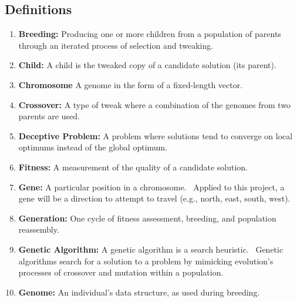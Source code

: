 \documentclass[letterpaper, 12pt]{article}
\begin{document}
  \subsection{Definitions}
  \begin{enumerate}
	 \item\label{breeding}
		\textbf{Breeding:}
		Producing one or more children from a population of parents through an iterated process of 
		selection and tweaking.~\cite{Luke2013Metaheuristics}
		
	 \item\label{child}
		\textbf{Child:}
		A child is the tweaked copy of a candidate solution (its parent).~\cite{Luke2013Metaheuristics}
	 
	 \item\label{chromosome}
		\textbf{Chromosome}
		A genome in the form of a fixed-length vector.~\cite{Luke2013Metaheuristics}

	 \item\label{crossover}
		\textbf{Crossover:}
		A type of tweak where a combination of the genomes from two parents are 
		used.~\cite{Luke2013Metaheuristics}
	 
	 \item\label{deceptiveProblem}
		\textbf{Deceptive Problem:}
		A problem where solutions tend to converge on local optimums instead of the global optimum.~\cite{paul}

	 \item\label{fitness} 
		\textbf{Fitness:}
		A measurement of the quality of a candidate solution.~\cite{Luke2013Metaheuristics}
	 
	 \item\label{gene}
		\textbf{Gene:}
		A particular position in a chromosome.~\cite{Luke2013Metaheuristics} Applied to this project, a gene will be a direction to attempt to travel (e.g., north, east, south, west).

	 \item\label{generation}
		\textbf{Generation:}
		One cycle of fitness assessment, breeding, and
		population reassembly.~\cite{Luke2013Metaheuristics}
	 
	 \item\label{geneticAlgorithm}
		\textbf{Genetic Algorithm:} A genetic algorithm is a search heuristic.~\cite{thomas} Genetic algorithms search for a solution to a problem by mimicking evolution's processes of crossover and mutation within a population.~\cite{paul}
	 \item\label{genome}
		\textbf{Genome:}
		An individual's data structure, as used during breeding.~\cite{Luke2013Metaheuristics}
	 

\end{enumerate}
\end{document}
